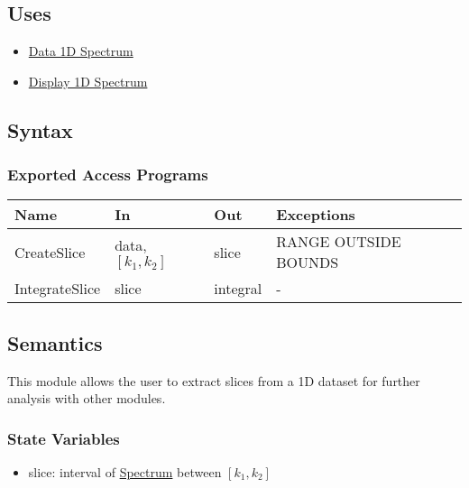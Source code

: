 \documentclass[12pt, titlepage]{article}
\begin{document}
\subsection{Uses}
\begin{itemize}
    \item \hyperref[Mod:Spectrum]{Data 1D Spectrum}
    \item \hyperref[Mod:Disp1D]{Display 1D Spectrum}
\end{itemize}

\subsection{Syntax}

\subsubsection{Exported Access Programs}

\begin{center}
    \begin{tabular}{p{3cm} p{4cm} p{4cm} p{2cm}}
        \hline
        \textbf{Name} & \textbf{In} & \textbf{Out} & \textbf{Exceptions} \\
        \hline
        CreateSlice & data, $[k_1, k_2]$ & slice & RANGE OUTSIDE BOUNDS \\
        IntegrateSlice & slice & integral & - \\
        \hline
    \end{tabular}
\end{center}


\subsection{Semantics}
This module allows the user to extract slices from a 1D dataset for further
analysis with other modules.

\subsubsection{State Variables}
\begin{itemize}
    \item slice: interval of \hyperref[Mod:Spectrum]{Spectrum} between $[k_1,
    k_2]$
\end{itemize}
\end{document}
